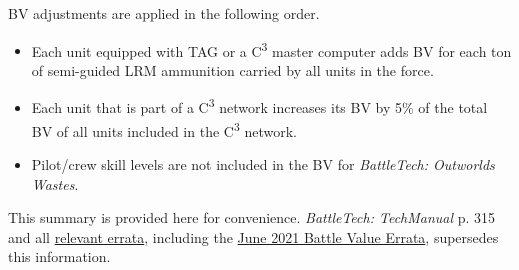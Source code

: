 BV adjustments are applied in the following order.

\begin{itemize}

  \item Each unit equipped with TAG or a C\textsuperscript{3} master computer adds BV for each ton of semi-guided LRM ammunition carried by all units in the force.

  \item Each unit that is part of a C\textsuperscript{3} network increases its BV by 5\% of the total BV of all units included in the C\textsuperscript{3} network.

  \item Pilot/crew skill levels are not included in the BV for \emph{BattleTech: Outworlds Wastes}.

\end{itemize}

This summary is provided here for convenience.
\emph{BattleTech: TechManual} p. 315 and all \href{https://bg.battletech.com/errata}{relevant errata}, including the \href{https://bg.battletech.com/wp-content/uploads/2021/06/TechManual-TM_BV4.1-Rev2021.pdf}{June 2021 Battle Value Errata}, supersedes this information.
